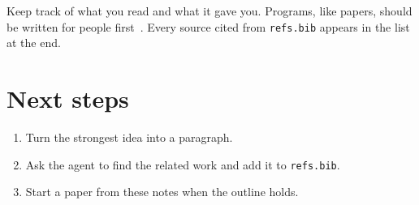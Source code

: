 Keep track of what you read and what it gave you. Programs, like papers,
should be written for people first~\citep{knuth1984}. Every source cited from
\texttt{refs.bib} appears in the list at the end.

\section{Next steps}

\begin{enumerate}
  \item Turn the strongest idea into a paragraph.
  \item Ask the agent to find the related work and add it to
    \texttt{refs.bib}.
  \item Start a paper from these notes when the outline holds.
\end{enumerate}





